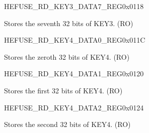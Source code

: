 \begin{register}{H}{EFUSE\_RD\_KEY3\_DATA7\_REG}{0x0118}\label{regdesc:EFUSERDKEY3DATA7REG}
%
\regnewline%
\begin{regdesc}\begin{reglist}
\label{fielddesc:EFUSEKEY3DATA7}\item [EFUSE\_KEY3\_DATA7] Stores the seventh 32 bits of KEY3. (RO)
\end{reglist}\end{regdesc}
\end{register}


\begin{register}{H}{EFUSE\_RD\_KEY4\_DATA0\_REG}{0x011C}\label{regdesc:EFUSERDKEY4DATA0REG}
%
\regnewline%
\begin{regdesc}\begin{reglist}
\label{fielddesc:EFUSEKEY4DATA0}\item [EFUSE\_KEY4\_DATA0] Stores the zeroth 32 bits of KEY4. (RO)
\end{reglist}\end{regdesc}
\end{register}


\begin{register}{H}{EFUSE\_RD\_KEY4\_DATA1\_REG}{0x0120}\label{regdesc:EFUSERDKEY4DATA1REG}
%
\regnewline%
\begin{regdesc}\begin{reglist}
\label{fielddesc:EFUSEKEY4DATA1}\item [EFUSE\_KEY4\_DATA1] Stores the first 32 bits of KEY4. (RO)
\end{reglist}\end{regdesc}
\end{register}


\begin{register}{H}{EFUSE\_RD\_KEY4\_DATA2\_REG}{0x0124}\label{regdesc:EFUSERDKEY4DATA2REG}
%
\regnewline%
\begin{regdesc}\begin{reglist}
\label{fielddesc:EFUSEKEY4DATA2}\item [EFUSE\_KEY4\_DATA2] Stores the second 32 bits of KEY4. (RO)
\end{reglist}\end{regdesc}
\end{register}


